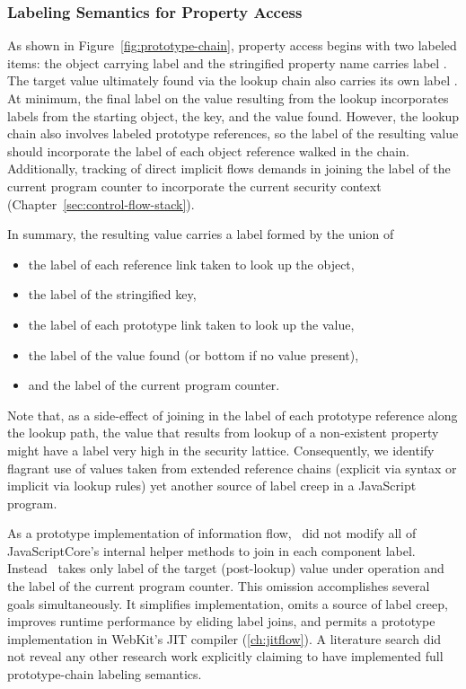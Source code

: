 \subsubsection{Labeling Semantics for Property Access}
As shown in Figure~\ref{fig:prototype-chain}, property access begins with two labeled items: the object  carrying label  and the stringified property name  carries label .
The target value  ultimately found via the lookup chain also carries its own label .
At minimum, the final label on the value resulting from the lookup incorporates labels from the starting object, the key, and the value found.
However, the lookup chain also involves labeled prototype references, so the label of the resulting value should incorporate the label of each object reference walked in the chain.
Additionally, tracking of direct implicit flows demands in joining the label of the current program counter to incorporate the current security context (Chapter~\ref{sec:control-flow-stack}).

In summary, the resulting value carries a label formed by the union of
\begin{itemize}
  \item the label of each reference link taken to look up the object,
  \item the label of the stringified key,
  \item the label of each prototype link taken to look up the value,
  \item the label of the value found (or bottom if no value present),
  \item and the label of the current program counter.
\end{itemize}

Note that, as a side-effect of joining in the label of each prototype reference along the lookup path, the  value that results from lookup of a non-existent property might have a label very high in the security lattice.
Consequently, we identify flagrant use of values taken from extended reference chains (explicit via syntax or implicit via lookup rules) yet another source of label creep in a JavaScript program.

As a prototype implementation of information flow, \FlowCore\ did not modify all of JavaScriptCore's internal helper methods to join in each component label.
Instead \FlowCore\ takes only label of the target (post-lookup) value under operation and the label of the current program counter.
This omission accomplishes several goals simultaneously.
It simplifies implementation, omits a source of label creep, improves runtime performance by eliding label joins, and permits a prototype implementation in WebKit's JIT compiler (\autoref{ch:jitflow}).
A literature search did not reveal any other research work explicitly claiming to have implemented full prototype-chain labeling semantics. %

